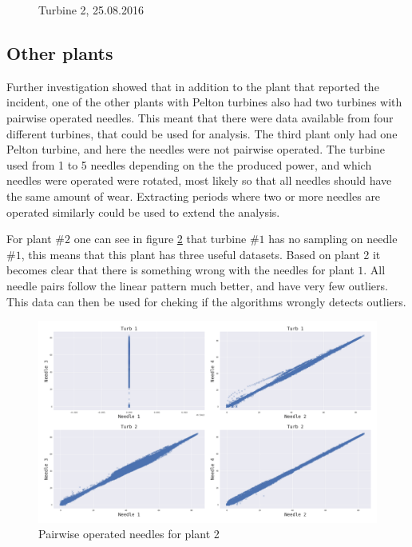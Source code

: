 \begin{figure}[h!]
\begin{minipage}[b]{0.5\linewidth}
                \caption{Turbine 2, 25.08.2016}
                \label{fig:start_failure_turb2}
            \end{minipage}
        \end{figure}
        
        
    
    \subsection{Other plants}
        Further investigation showed that in addition to the plant that reported the incident, one of the other plants with Pelton turbines also had two turbines with pairwise operated needles. This meant that there were data available from four different turbines, that could be used for analysis. The third plant only had one Pelton turbine, and here the needles were not pairwise operated. The turbine used from 1 to 5 needles depending on the the produced power, and which needles were operated were rotated, most likely so that all needles should have the same amount of wear. Extracting periods where two or more needles are operated similarly could be used to extend the analysis.   
        
        For plant #$2$ one can see in figure \ref{fig:plant2_needles} that turbine #$1$ has no sampling on needle #$1$, this means that this plant has three useful datasets. Based on plant 2 it becomes clear that there is something wrong with the needles for plant $1$. All needle pairs follow the linear pattern much better, and have very few outliers. This data can then be used for cheking if the algorithms wrongly detects outliers.
        
        \begin{figure}
            \centering
            \includegraphics[width=\textwidth]{report/figures/data/plant_2_needle_plot.png}
            \caption{Pairwise operated needles for plant 2}
            \label{fig:plant2_needles}
        \end{figure}
        
